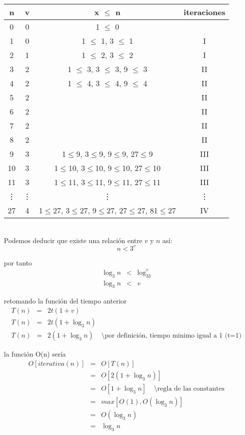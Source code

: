 \begin{tabular}{c|c|c|c}
  n & v & x $\leq$ n & iteraciones\\ \hline
  0 & 0 & 1 $\leq$ 0 & \\
  1 & 0 & 1 $\leq$ 1, 3 $\leq$ 1 & I\\
  2 & 1 & 1 $\leq$ 2, 3 $\leq$ 2 & I\\
  3 & 2 & 1 $\leq$ 3, 3 $\leq$ 3, 9 $\leq$ 3 & II\\
  4 & 2 & 1 $\leq$ 4, 3 $\leq$ 4, 9 $\leq$ 4 & II\\
  5 & 2 &   & II\\
  6 & 2 &   & II\\
  7 & 2 &   & II\\
  8 & 2 &   & II\\
  9 & 3 & 1$\leq$9, 3$\leq$9, 9$\leq$9, 27$\leq$9 & III\\
  10 & 3 & 1$\leq$10, 3$\leq$10, 9$\leq$10, 27$\leq$10 & III\\
  11 & 3 & 1$\leq$11, 3$\leq$11, 9$\leq$11, 27$\leq$11 & III\\
  \vdots & \vdots & \vdots & \vdots\\
  27 & 4 & 1$\leq$27, 3$\leq$27, 9$\leq$27, 27$\leq$27, 81$\leq$27&IV\\
\end{tabular}
\\[.5cm]
Podemos deducir que existe una relación entre $v$ y $n$ así:
$$n <  3^v$$

por tanto
\begin{eqnarray*}
  \log_3n &<&\log_33^v\\
  \log_3n&<&v
\end{eqnarray*}

retomando la función del tiempo anterior
\begin{eqnarray*}
  T(n)&=&2t(1+v)\\
  T(n)&=&2t(1+\log_3n)\\
  T(n)&=&2(1+\log_3n)\;\;\;\;  \setminus \text{por definición, tiempo minimo igual a 1 (t=1)}
\end{eqnarray*}

la función O(n) sería
\begin{eqnarray*}
  O[iterativa(n)] &=& O[T(n)]\\
                  &=& O[2(1+\log_3n)]\\
                  &=& O[1+\log_3n]\;\;\;\;  \setminus \text{regla de las constantes}\\
                  &=& max[O(1), O(\log_3n)]\\
                  &=&O(\log_3n)\\
                  &=& \log_3n
\end{eqnarray*}

